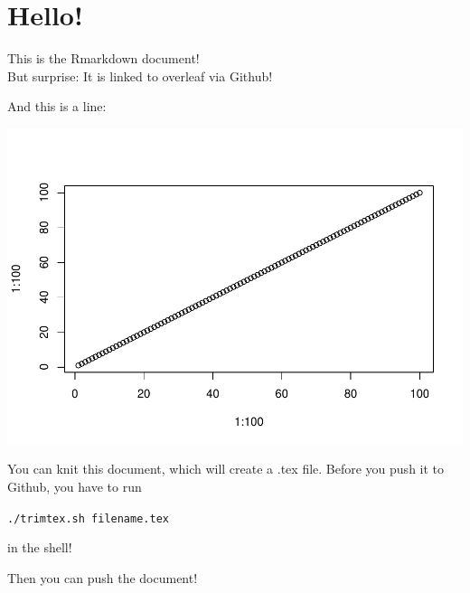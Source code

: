 
\hypertarget{hello}{%
\section{Hello!}\label{hello}}

This is the Rmarkdown document!\\
But surprise: It is linked to overleaf via Github!

And this is a line:

\begin{Shaded}
\begin{Highlighting}[]
\NormalTok{(}\OperatorTok{:}\NormalTok{, }\OperatorTok{:}\NormalTok{)}
\end{Highlighting}
\end{Shaded}

\includegraphics{rmd_files/figure-latex/unnamed-chunk-1-1.pdf}

You can knit this document, which will create a .tex file. Before you
push it to Github, you have to run

\texttt{./trimtex.sh\ filename.tex}

in the shell!

Then you can push the document!

